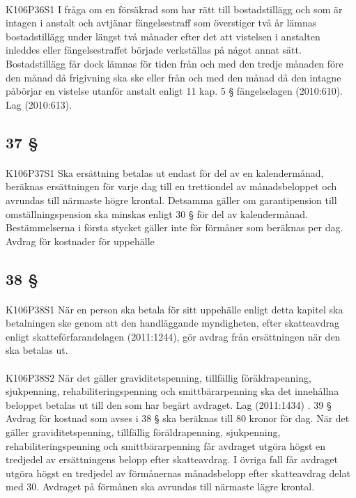 \documentclass[a4paper,notitlepage,openany,10pt]{book}
\begin{document}
\paragraph*{}
{\tiny K106P36S1}
I fråga om en försäkrad som har rätt till bostadstillägg och som är intagen i anstalt och avtjänar fängelsestraff som överstiger två år lämnas bostadstillägg under längst två månader efter det att vistelsen i anstalten inleddes eller fängelsestraffet började verkställas på något annat sätt.
Bostadstillägg får dock lämnas för tiden från och med den tredje månaden före den månad då frigivning ska ske eller från och med den månad då den intagne påbörjar en vistelse utanför anstalt enligt 11 kap. 5 § fängelselagen (2010:610).
Lag (2010:613).
\subsection*{37 §}
\paragraph*{}
{\tiny K106P37S1}
Ska ersättning betalas ut endast för del av en kalendermånad, beräknas ersättningen för varje dag till en trettiondel av månadsbeloppet och avrundas till närmaste högre krontal. Detsamma gäller om garantipension till omställningspension ska minskas enligt 30 § för del av kalendermånad.
Bestämmelserna i första stycket gäller inte för förmåner som beräknas per dag.
Avdrag för kostnader för uppehälle
\subsection*{38 §}
\paragraph*{}
{\tiny K106P38S1}
När en person ska betala för sitt uppehälle enligt detta kapitel ska betalningen ske genom att den handläggande myndigheten, efter skatteavdrag enligt skatteförfarandelagen (2011:1244), gör avdrag från ersättningen när den ska betalas ut.
\paragraph*{}
{\tiny K106P38S2}
När det gäller graviditetspenning, tillfällig föräldrapenning, sjukpenning, rehabiliteringspenning och smittbärarpenning ska det innehållna beloppet betalas ut till den som har begärt avdraget.
Lag (2011:1434)
. 39 § Avdrag för kostnad som avses i 38 § ska beräknas till 80 kronor för dag.
När det gäller graviditetspenning, tillfällig föräldrapenning, sjukpenning, rehabiliteringspenning och smittbärarpenning får avdraget utgöra högst en tredjedel av ersättningens belopp efter skatteavdrag. I övriga fall får avdraget utgöra högst en tredjedel av förmånernas månadsbelopp efter skatteavdrag delat med 30. Avdraget på förmånen ska avrundas till närmaste lägre krontal.
\end{document}
